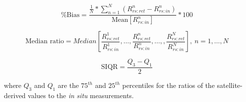 \documentclass[onecolumn,3p,letterpaper,11pt]{elsarticle}
\begin{document}
\begin{linenomath*}
\begin{equation}
    \text{\% Bias} = \frac{\displaystyle \frac{1}{N}*\sum_{n=1}^N(R_{rs:ret}^n-R_{rs:in}^n)}{\text{Mean}[R_{rs:in}^n]}*100
\end{equation}
\end{linenomath*}
\begin{linenomath*}
\begin{equation}
  \text{Median ratio} =  Median\left[\frac{R_{rs:ret}^1}{R_{rs:in}^1},\dots,\frac{R_{rs:ret}^n}{R_{rs:in}^n},\dots,,\frac{R_{rs:ret}^N}{R_{rs:in}^N}\right],\ n=1,\dots,N
\end{equation}
\end{linenomath*}
\begin{linenomath*}
\begin{equation}
    \text{SIQR} = \frac{Q_3-Q_1}{2}
\end{equation}
\end{linenomath*}
\noindent where $Q_3$ and $Q_1$ are the $75^{th}$ and $25^{th}$ percentiles for the ratios of the satellite-derived values to the {\it in situ} measurements.  
\end{document}
